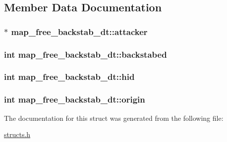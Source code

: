 \subsection{Member Data Documentation}
\hypertarget{structmap__free__backstab__dt_a6304d2a852315acac57974a49aace111}{
\subsubsection[{attacker}]{$\ast$ map\-\_\-free\-\_\-backstab\-\_\-dt\-::attacker}}\label{structmap__free__backstab__dt_a6304d2a852315acac57974a49aace111}
\hypertarget{structmap__free__backstab__dt_a8ba4127866102f63b8649c64582ad582}{
\subsubsection[{backstabed}]{\setlength{\rightskip}{0pt plus 5cm}int map\-\_\-free\-\_\-backstab\-\_\-dt\-::backstabed}}\label{structmap__free__backstab__dt_a8ba4127866102f63b8649c64582ad582}
\hypertarget{structmap__free__backstab__dt_a0338cf2d2c577bd0ab3c3722615da889}{
\subsubsection[{hid}]{\setlength{\rightskip}{0pt plus 5cm}int map\-\_\-free\-\_\-backstab\-\_\-dt\-::hid}}\label{structmap__free__backstab__dt_a0338cf2d2c577bd0ab3c3722615da889}
\hypertarget{structmap__free__backstab__dt_ab996734d78f3dd7b36dd46c6b7c12e62}{
\subsubsection[{origin}]{\setlength{\rightskip}{0pt plus 5cm}int map\-\_\-free\-\_\-backstab\-\_\-dt\-::origin}}\label{structmap__free__backstab__dt_ab996734d78f3dd7b36dd46c6b7c12e62}


The documentation for this struct was generated from the following file\-:\begin{DoxyCompactItemize}
\item 
\hyperlink{structs_8h}{structs.\-h}\end{DoxyCompactItemize}
